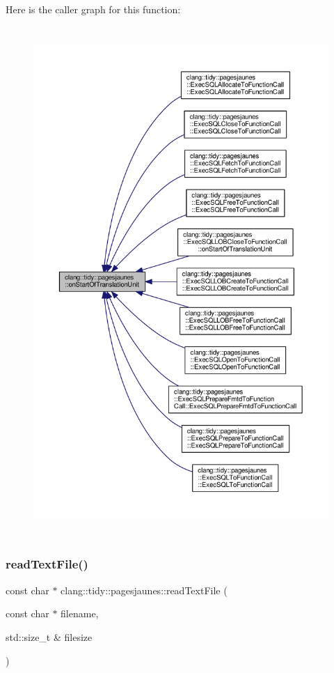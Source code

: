 Here is the caller graph for this function\+:
\nopagebreak
\begin{figure}[H]
\begin{center}
\leavevmode
\includegraphics[height=550pt]{namespaceclang_1_1tidy_1_1pagesjaunes_a02da712a4fa75552524d9f2e1964c270_icgraph}
\end{center}
\end{figure}
\mbox{\label{namespaceclang_1_1tidy_1_1pagesjaunes_a0b01f45cc67d6eaa7514e381edabfeba}} 
\subsubsection{\texorpdfstring{read\+Text\+File()}{readTextFile()}}
{\footnotesize\ttfamily const char $\ast$ clang\+::tidy\+::pagesjaunes\+::read\+Text\+File (\begin{DoxyParamCaption}\item[{const char $\ast$}]{filename,  }\item[{std\+::size\+\_\+t \&}]{filesize }\end{DoxyParamCaption})}



